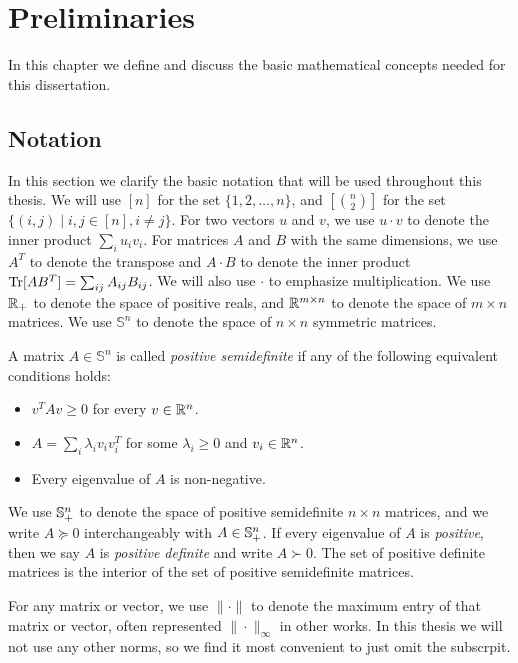 \chapter{Preliminaries}\label{cha:prelims}
In this chapter we define and discuss the basic mathematical concepts needed for this dissertation.

\section{Notation}
In this section we clarify the basic notation that will be used throughout this thesis. We will use $[n]$ for the set $\{1,2,\dots,n\}$, and $[\binom{n}{2}]$ for the set $\{(i,j) \mid i,j \in [n], i \neq j\}$. For two vectors $u$ and $v$, we use $u \cdot v$ to denote the inner product $\sum_i u_i v_i$. For matrices $A$ and $B$ with the same dimensions, we use $A^T$ to denote the transpose and $A \cdot B$ to denote the inner product $\operatorname{Tr}[AB^T] = \sum_{ij} A_{ij}B_{ij}$. We will also use $\cdot$ to emphasize multiplication. We use $\mathbb R_+$ to denote the space of positive reals, and $\mathbb R^{m \times n}$ to denote the space of $m \times n$ matrices. We use $\mathbb{S}^{n}$ to denote the space of $n \times n$ symmetric matrices.
\begin{definition}
A matrix $A \in \mathbb{S}^{n}$ is called \emph{positive semidefinite} if any of the following equivalent conditions holds:
\begin{itemize}
\item $v^TAv \geq 0$ for every $v \in \mathbb R^n$.
\item $A = \sum_i \lambda_i v_iv_i^T$ for some $\lambda_i \geq 0$ and $v_i \in \mathbb R^n$.
\item Every eigenvalue of $A$ is non-negative.
\end{itemize}
\end{definition}
We use $\mathbb{S}^{n}_+$ to denote the space of positive semidefinite $n \times n$ matrices, and we write $A \succeq 0$ interchangeably with $A \in \mathbb{S}^{n}_+$. If every eigenvalue of $A$ is \emph{positive}, then we say $A$ is \emph{positive definite} and write $A \succ 0$. The set of positive definite matrices is the interior of the set of positive semidefinite matrices.

For any matrix or vector, we use $\|\cdot\|$ to denote the maximum entry of that matrix or vector, often represented $\|\cdot\|_\infty$ in other works. In this thesis we will not use any other norms, so we find it most convenient to just omit the subscrpit.


